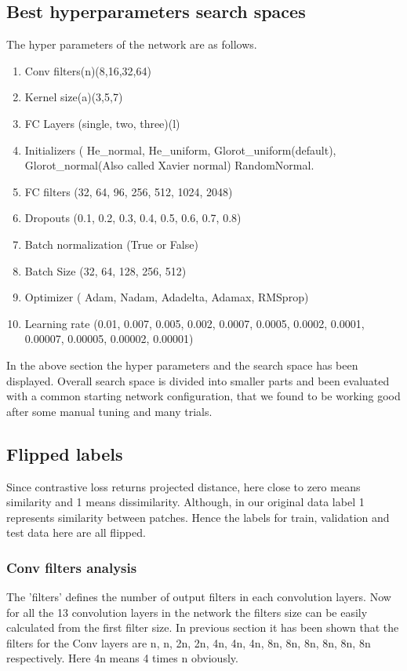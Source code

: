 \subsection{Best hyperparameters search spaces}
The hyper parameters of the network are as follows.
  \begin{enumerate}
    \item Conv filters(n)(8,16,32,64)
    \item Kernel size(a)(3,5,7)
    \item FC Layers (single, two, three)(l) 
    \item Initializers ( He\_normal, He\_uniform, Glorot\_uniform(default), Glorot\_normal(Also called Xavier normal) RandomNormal.    
    \item FC filters (32, 64, 96, 256, 512, 1024, 2048)
    \item Dropouts (0.1, 0.2, 0.3, 0.4, 0.5, 0.6, 0.7, 0.8)
    \item Batch normalization (True or False)
    \item Batch Size (32, 64, 128, 256, 512)
    \item Optimizer ( Adam, Nadam, Adadelta, Adamax, RMSprop)
    \item Learning rate (0.01, 0.007, 0.005, 0.002, 0.0007, 0.0005, 0.0002, 0.0001, 0.00007, 0.00005, 0.00002, 0.00001)   
  \end{enumerate}
  In the above section the hyper parameters and the search space has been displayed. Overall search space is divided into smaller parts and been evaluated with a common starting network configuration, that we found to be working good after 
  some manual tuning and many trials.
  
\subsection{Flipped labels}
Since contrastive loss returns projected distance, here close to zero means similarity and 1 means dissimilarity. Although, in our original data label 1 represents similarity between patches.
Hence the labels for train, validation and test data here are all flipped.   
  
\subsubsection{Conv filters analysis}
The 'filters'\cite{kerasconv} defines the number of output filters in each convolution layers. Now for all the 13 convolution layers in the network the filters size can be easily calculated from the first filter size. In previous section
it has been shown that the filters for the Conv layers are n, n, 2n, 2n, 4n, 4n, 4n, 8n, 8n, 8n, 8n, 8n, 8n respectively. Here 4n means 4 times n obviously. 

